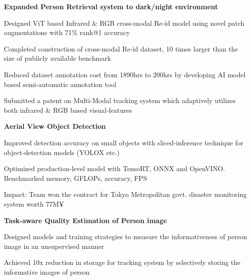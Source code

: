\documentclass[a4paper,10pt]{article}
\newcommand{\SubItem}[1]{
    {\setlength\itemindent{13pt} \item[\raisebox{.25\height}{\tiny\square}] #1}
}
\newlength{\itemgap}
\newlength{\itembefore}
\newcommand\scl{1.05}
\begin{document}
\begin{itemize}[topsep=\itembefore,itemsep=\itemgap,partopsep=0pt, parsep=0pt]


\item \textbf {Expanded Person Retrieval system to dark/night environment}
\SubItem{Designed ViT based Infrared \& RGB cross-modal Re-id model using novel patch augmentations with 71\% rank@1 accuracy}
\SubItem{Completed construction of cross-modal Re-id dataset, 10 times larger than the size of publicly available benchmark}
\SubItem{Reduced dataset annotation cost from 1890hrs to 200hrs by developing AI model based semi-automatic annotation tool}
\SubItem{Submitted a patent on Multi-Modal tracking system which adaptively utilizes both infrared \& RGB based visual-features}

\item \textbf {Aerial View Object Detection}
\SubItem{Improved detection accuracy on small objects with sliced-inference technique for object-detection models (YOLOX etc.)}
\SubItem{Optimized production-level model with TensoRT, ONNX and OpenVINO. Benchmarked memory, GFLOPs, accuracy, FPS}
\SubItem{Impact: Team won the contract for Tokyo Metropolitan govt. disaster monitoring system worth 77M¥}

\item \textbf {Task-aware Quality Estimation of Person image}
\SubItem{Designed models and training strategies to measure the informativeness of person image in an unsupervised manner}
\SubItem{Achieved 10x reduction in storage for tracking system by selectively storing the informative images of person}
\end{itemize}








\end{document}
